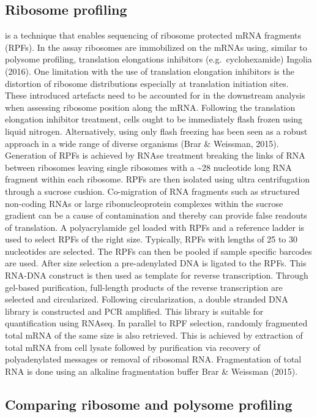 \documentclass[
  12pt,
  openany]{book}
\begin{document}
\subsection{Ribosome profiling}

is a technique that enables sequencing of ribosome protected mRNA fragments (RPFs). In the assay ribosomes are immobilized on the mRNAs using, similar to polysome profiling, translation elongations inhibitors (e.g.~cyclohexamide) Ingolia (2016). One limitation with the use of translation elongation inhibitors is the distortion of ribosome distributions especially at translation initiation sites. These introduced artefacts need to be accounted for in the downstream analysis when assessing ribosome position along the mRNA. Following the translation elongation inhibitor treatment, cells ought to be immediately flash frozen using liquid nitrogen. Alternatively, using only flash freezing has been seen as a robust approach in a wide range of diverse organisms (Brar \& Weissman, 2015). Generation of RPFs is achieved by RNAse treatment breaking the links of RNA between ribosomes leaving single ribosomes with a \textasciitilde28 nucleotide long RNA fragment within each ribosome. RPFs are then isolated using ultra centrifugation through a sucrose cushion. Co-migration of RNA fragments such as structured non-coding RNAs or large ribonucleoprotein complexes within the sucrose gradient can be a cause of contamination and thereby can provide false readouts of translation. A polyacrylamide gel loaded with RPFs and a reference ladder is used to select RPFs of the right size. Typically, RPFs with lengths of 25 to 30 nucleotides are selected. The RPFs can then be pooled if sample specific barcodes are used. After size selection a pre-adenylated DNA is ligated to the RPFs. This RNA-DNA construct is then used as template for reverse transcription. Through gel-based purification, full-length products of the reverse transcription are selected and circularized. Following circularization, a double stranded DNA library is constructed and PCR amplified. This library is suitable for quantification using RNAseq. In parallel to RPF selection, randomly fragmented total mRNA of the same size is also retrieved. This is achieved by extraction of total mRNA from cell lysate followed by purification via recovery of polyadenylated messages or removal of ribosomal RNA. Fragmentation of total RNA is done using an alkaline fragmentation buffer Brar \& Weissman (2015).

\subsection{Comparing ribosome and polysome profiling}
\end{document}
